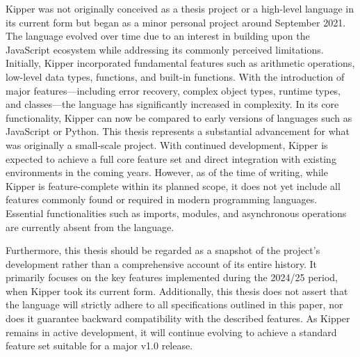 Kipper was not originally conceived as a thesis project or a high-level language in its current form but began as a minor personal project around September 2021. The language evolved over time due to an interest in building upon the JavaScript ecosystem while addressing its commonly perceived limitations. Initially, Kipper incorporated fundamental features such as arithmetic operations, low-level data types, functions, and built-in functions. With the introduction of major features—including error recovery, complex object types, runtime types, and classes—the language has significantly increased in complexity. In its core functionality, Kipper can now be compared to early versions of languages such as JavaScript or Python. This thesis represents a substantial advancement for what was originally a small-scale project. With continued development, Kipper is expected to achieve a full core feature set and direct integration with existing environments in the coming years. However, as of the time of writing, while Kipper is feature-complete within its planned scope, it does not yet include all features commonly found or required in modern programming languages. Essential functionalities such as imports, modules, and asynchronous operations are currently absent from the language.

Furthermore, this thesis should be regarded as a snapshot of the project's development rather than a comprehensive account of its entire history. It primarily focuses on the key features implemented during the 2024/25 period, when Kipper took its current form. Additionally, this thesis does not assert that the language will strictly adhere to all specifications outlined in this paper, nor does it guarantee backward compatibility with the described features. As Kipper remains in active development, it will continue evolving to achieve a standard feature set suitable for a major v1.0 release.


